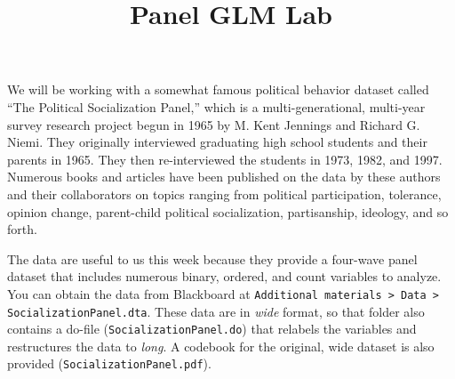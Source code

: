 \documentclass[a4paper,12pt]{article}
\title{Panel GLM Lab}
\begin{document}
\maketitle

{\onehalfspacing
\noindent We will be working with a somewhat famous political behavior dataset called ``The Political Socialization Panel,'' which is a multi-generational, multi-year survey research project begun in 1965 by M. Kent Jennings and Richard G. Niemi. They originally interviewed graduating high school students and their parents in 1965. They then re-interviewed the students in 1973, 1982, and 1997. Numerous books and articles have been published on the data by these authors and their collaborators on topics ranging from political participation, tolerance, opinion change, parent-child political socialization, partisanship, ideology, and so forth.

The data are useful to us this week because they provide a four-wave panel dataset that includes numerous binary, ordered, and count variables to analyze. You can obtain the data from Blackboard at \texttt{Additional materials > Data > SocializationPanel.dta}. These data are in \textit{wide} format, so that folder also contains a do-file (\texttt{SocializationPanel.do}) that relabels the variables and restructures the data to \textit{long}. A codebook for the original, wide dataset is also provided (\texttt{SocializationPanel.pdf}).

}
\end{document}
